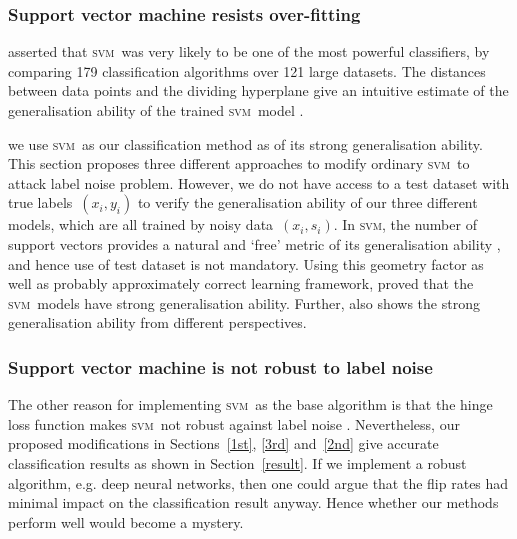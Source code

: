 \documentclass[12pt]{article} %
\newcommand{\svm}{\textsc{svm}}
\begin{document}
\subsubsection{Support vector machine resists over-fitting}\label{sec:over}
\citet{Fernandez-Delgado:2014:WNH:2627435.2697065} asserted that \svm\ was very likely to be one of the most powerful classifiers, by comparing 179 classification algorithms over 121 large datasets. The distances between data points and the dividing hyperplane give an intuitive estimate of the generalisation ability of the trained \svm\ model \citep{hastie01statisticallearning}.


we use \svm\ as our classification method as of its strong generalisation ability. %
This section proposes three different approaches to modify ordinary \svm\ to attack label noise problem. However, we do not have access to a test dataset with true labels~$(x_i,y_i)$ to verify the generalisation ability of our three different models, which are all trained by noisy data~$(x_i,s_i)$. In \svm , the number of support vectors provides a natural and `free' metric of its generalisation ability  \citep{hastie01statisticallearning}, and hence use of test dataset is not mandatory. Using this geometry factor as well as probably approximately correct learning framework,  \citet{NIPS2012_4500} proved that the  \svm\ models have strong generalisation ability. Further,  \citep{Cortes1995,Seeger:2003:PGE:944919.944929} also shows the strong generalisation ability from different perspectives.

\subsubsection{Support vector machine is not robust to label noise}

The other reason for implementing \svm\ as the base algorithm is that the hinge loss function makes \svm\ not robust against label noise \citep{frenay2014classification}. Nevertheless, our proposed modifications in Sections~\ref{1st}, \ref{3rd} and~\ref{2nd} give accurate classification results as shown in Section~\ref{result}. If we implement a robust algorithm, e.g. deep neural networks, then one could argue that the flip rates had minimal impact on the classification result anyway. Hence whether our methods perform well would become a mystery.

\end{document}
